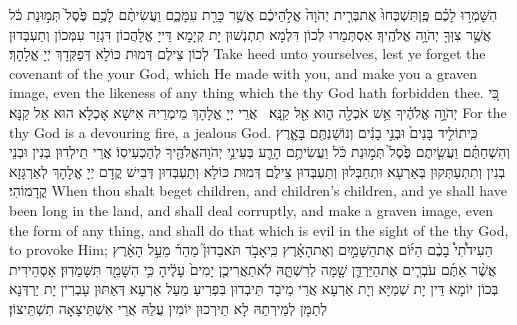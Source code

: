 {הִשָּׁמְר֣וּ לָכֶ֗ם פֶּֽן\maqqaf תִּשְׁכְּחוּ֙ אֶת\maqqaf בְּרִ֤ית יְהֹוָה֙ אֱלֹ֣הֵיכֶ֔ם אֲשֶׁ֥ר כָּרַ֖ת עִמָּכֶ֑ם וַעֲשִׂיתֶ֨ם לָכֶ֥ם פֶּ֙סֶל֙ תְּמ֣וּנַת כֹּ֔ל אֲשֶׁ֥ר צִוְּךָ֖ יְהֹוָ֥ה אֱלֹהֶֽיךָ׃}
{אִסְתְּמַרוּ לְכוֹן דִּלְמָא תִתְנְשׁוּן יָת קְיָמָא דַּייָ אֱלָהֲכוֹן דִּגְזַר עִמְּכוֹן וְתַעְבְּדוּן לְכוֹן צֵילֶם דְּמוּת כּוֹלָא דְּפַקְּדָךְ יְיָ אֱלָהָךְ׃}
{Take heed unto yourselves, lest ye forget the covenant of the \lord\space your God, which He made with you, and make you a graven image, even the likeness of any thing which the \lord\space thy God hath forbidden thee.}{}
{כִּ֚י יְהֹוָ֣ה אֱלֹהֶ֔יךָ אֵ֥שׁ אֹכְלָ֖ה ה֑וּא אֵ֖ל קַנָּֽא׃ \petucha }
{אֲרֵי יְיָ אֱלָהָךְ מֵימְרֵיהּ אִישָׁא אָכְלָא הוּא אֵל קַנָּא׃}
{For the \lord\space thy God is a devouring fire, a jealous God.}{}
{כִּֽי\maqqaf תוֹלִ֤יד בָּנִים֙ וּבְנֵ֣י בָנִ֔ים וְנוֹשַׁנְתֶּ֖ם בָּאָ֑רֶץ וְהִשְׁחַתֶּ֗ם וַעֲשִׂ֤יתֶם פֶּ֙סֶל֙ תְּמ֣וּנַת כֹּ֔ל וַעֲשִׂיתֶ֥ם הָרַ֛ע בְּעֵינֵ֥י יְהֹוָה\maqqaf אֱלֹהֶ֖יךָ לְהַכְעִיסֽוֹ׃}
{אֲרֵי תֵילְדוּן בְּנִין וּבְנֵי בְנִין וְתִתְעַתְּקוּן בְּאַרְעָא וּתְחַבְּלוּן וְתַעְבְּדוּן צֵילֶם דְּמוּת כּוֹלָא וְתַעְבְּדוּן דְּבִישׁ קֳדָם יְיָ אֱלָהָךְ לְאַרְגָּזָא קֳדָמוֹהִי׃}
{When thou shalt beget children, and children’s children, and ye shall have been long in the land, and shall deal corruptly, and make a graven image, even the form of any thing, and shall do that which is evil in the sight of the \lord\space thy God, to provoke Him;}{}
{הַעִידֹ֩תִי֩ בָכֶ֨ם הַיּ֜וֹם אֶת\maqqaf הַשָּׁמַ֣יִם וְאֶת\maqqaf הָאָ֗רֶץ כִּֽי\maqqaf אָבֹ֣ד תֹּאבֵדוּן֮ מַהֵר֒ מֵעַ֣ל הָאָ֔רֶץ אֲשֶׁ֨ר אַתֶּ֜ם עֹבְרִ֧ים אֶת\maqqaf הַיַּרְדֵּ֛ן שָׁ֖מָּה לְרִשְׁתָּ֑הּ לֹֽא\maqqaf תַאֲרִיכֻ֤ן יָמִים֙ עָלֶ֔יהָ כִּ֥י הִשָּׁמֵ֖ד תִּשָּׁמֵדֽוּן׃}
{אַסְהֵידִית בְּכוֹן יוֹמָא דֵּין יָת שְׁמַיָּא וְיָת אַרְעָא אֲרֵי מֵיבָד תֵּיבְדוּן בִּפְרִיעַ מֵעַל אַרְעָא דְּאַתּוּן עָבְרִין יָת יַרְדְּנָא לְתַמָּן לְמֵירְתַהּ לָא תֵירְכוּן יוֹמִין עֲלַהּ אֲרֵי אִשְׁתֵּיצָאָה תִשְׁתֵּיצוֹן׃}
